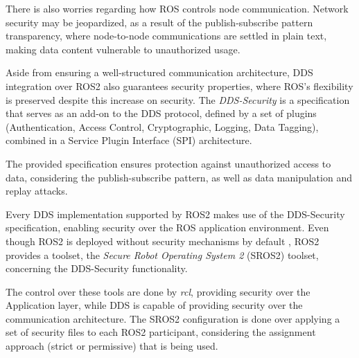 There is also worries regarding how ROS controls node communication. Network security may be jeopardized, as a result of the publish-subscribe pattern transparency, where node-to-node communications are settled in plain text, making data content vulnerable to unauthorized usage. \cite{kim2018security}

Aside from ensuring a well-structured communication architecture, DDS integration over ROS2 also guarantees security properties, where ROS's flexibility is preserved despite this increase on security. The \textit{DDS-Security} \cite{dds-s} is a specification that serves as an add-on to the DDS protocol, defined by a set of plugins (Authentication, Access Control, Cryptographic, Logging, Data Tagging), combined in a Service Plugin Interface (SPI) architecture. 

The provided specification ensures protection against unauthorized access to data, considering the publish-subscribe pattern, as well as data manipulation and replay attacks. \cite{8442103, ros-dds-integration}



Every DDS implementation supported by ROS2 makes use of the DDS-Security specification, enabling security over the ROS application environment. Even though ROS2 is deployed without security mechanisms by default \cite{ros-dds-integration}, ROS2 provides a toolset, the \textit{Secure Robot Operating System 2} (SROS2) toolset, concerning the DDS-Security functionality. 

The control over these tools are done by \textit{rcl}, providing security over the Application layer, while DDS is capable of providing security over the communication architecture. \cite{kim2018security} The SROS2 configuration is done over applying a set of security files to each ROS2 participant, considering the assignment approach (strict or permissive) that is being used.

